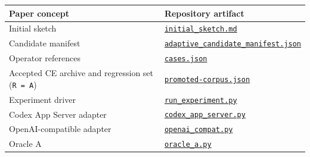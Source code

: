 {\def\LTcaptype{none} %
\begin{longtable}[]{@{}
  >{\raggedright\arraybackslash}p{}
  >{\raggedright\arraybackslash}p{}@{}}
\toprule\noalign{}
\begin{minipage}[b]{\linewidth}\raggedright
Paper concept
\end{minipage} & \begin{minipage}[b]{\linewidth}\raggedright
Repository artifact
\end{minipage} \\
\midrule\noalign{}
\endhead
\bottomrule\noalign{}
\endlastfoot
Initial sketch & \href{https://github.com/open-horizon-labs/counterexample-supplemented-sketches/blob/main/examples/catsynth/experiment/initial_sketch.md}{\texttt{initial\_sketch.md}} \\
Candidate manifest & \href{https://github.com/open-horizon-labs/counterexample-supplemented-sketches/blob/main/examples/catsynth/experiment/adaptive_candidate_manifest.json}{\texttt{adaptive\_candidate\_manifest.json}} \\
Operator references & \href{https://github.com/open-horizon-labs/counterexample-supplemented-sketches/blob/main/examples/catsynth/experiment/cases.json}{\texttt{cases.json}} \\
Accepted CE archive and regression set (\texttt{R\ =\ A}) & \href{https://github.com/open-horizon-labs/counterexample-supplemented-sketches/blob/main/examples/catsynth/experiment/results/gpt-5.4-mini-adaptive-open-world-v2-20260712/promoted-corpus.json}{\texttt{promoted-corpus.json}} \\
Experiment driver & \href{https://github.com/open-horizon-labs/counterexample-supplemented-sketches/blob/main/examples/catsynth/experiment/run_experiment.py}{\texttt{run\_experiment.py}} \\
Codex App Server adapter & \href{https://github.com/open-horizon-labs/counterexample-supplemented-sketches/blob/main/examples/catsynth/catsynth/codex_app_server.py}{\texttt{codex\_app\_server.py}} \\
OpenAI-compatible adapter & \href{https://github.com/open-horizon-labs/counterexample-supplemented-sketches/blob/main/examples/catsynth/catsynth/openai_compat.py}{\texttt{openai\_compat.py}} \\
Oracle A & \href{https://github.com/open-horizon-labs/counterexample-supplemented-sketches/blob/main/examples/catsynth/catsynth/oracle_a.py}{\texttt{oracle\_a.py}} \\

\end{longtable}}

